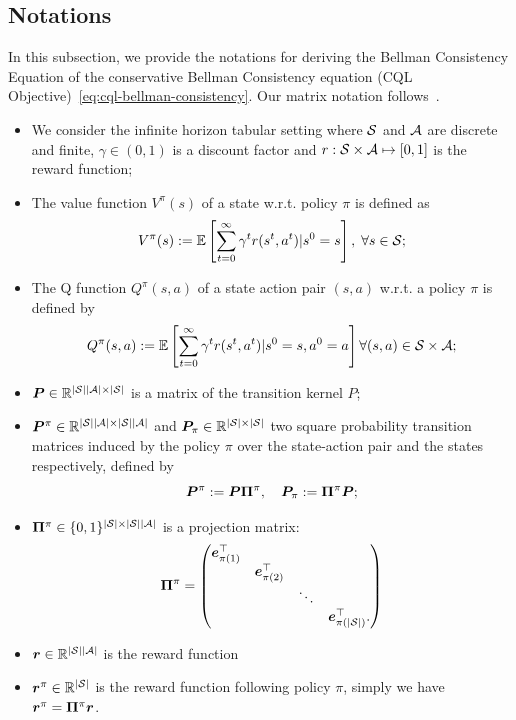 \subsection{Notations}
In this subsection, we provide the notations for deriving the Bellman Consistency Equation of the conservative Bellman Consistency equation (CQL Objective)~\eqref{eq:cql-bellman-consistency}. Our matrix notation follows~\cite{li2020breaking}. 
\begin{itemize}
    \item We consider the infinite horizon tabular setting where $\mathcal S$ and $\mathcal A$ are discrete and finite, $\gamma \in (0,1)$ is a discount factor and $r:\mathcal S\times \mathcal A \mapsto[0,1]$ is the reward function;
    \item The value function $V^\pi(s)$ of a state w.r.t. policy $\pi$ is defined as 
    \begin{equation}
        V^\pi(s) := \mathbb E\left[ \sum_{t=0}^\infty \gamma^t r(s^t,a^t)|s^0=s \right],\;\forall s \in \mathcal S;
    \end{equation}
    \item The Q function $Q^\pi(s,a)$ of a state action pair $(s,a)$ w.r.t. a policy $\pi$ is defined by
    \begin{equation}
        Q^\pi(s,a):=\mathbb E\left[ \sum_{t=0}^\infty\gamma^t r(s^t,a^t)|s^0=s,a^0=a \right]\forall (s,a)\in \mathcal S\times \mathcal A;
    \end{equation}
    \item $\boldsymbol P\in \mathbb R^{|\mathcal S||\mathcal A|\times |\mathcal S|}$ is a matrix of the transition kernel $P$;
    \item $\boldsymbol P^\pi\in\mathbb R^{|\mathcal S||\mathcal A|\times |\mathcal S||\mathcal A|}$ and  $\boldsymbol P_\pi\in\mathbb R^{|\mathcal S|\times |\mathcal S|}$ two square probability transition matrices induced by the policy $\pi$ over the state-action pair and the states respectively, defined by
    \begin{equation}
        \boldsymbol P^\pi := \boldsymbol P \boldsymbol \Pi^\pi,\quad \boldsymbol P_\pi := \boldsymbol \Pi^\pi\boldsymbol P;
    \end{equation}
    \item $\boldsymbol \Pi^\pi\in \{0,1\}^{|\mathcal S|\times |\mathcal S||\mathcal A|}$ is a projection matrix:
    \begin{equation}
        \boldsymbol \Pi^\pi = 
        \begin{pmatrix}
            \boldsymbol e^\top_{\pi(1)} & & & \\
             & \boldsymbol e^\top_{\pi(2)} & & \\
             & & \ddots & \\
             & & & \boldsymbol e^\top_{\pi(|\mathcal S|)}.
        \end{pmatrix}
    \end{equation}
    \item $\boldsymbol r\in \mathbb R^{|\mathcal S||\mathcal A|}$ is the reward function
    \item $\boldsymbol r^\pi \in \mathbb R^{|\mathcal S|}$ is the reward function following policy $\pi$, simply we have $\boldsymbol r^\pi = \boldsymbol \Pi^\pi\boldsymbol r$.
\end{itemize}
